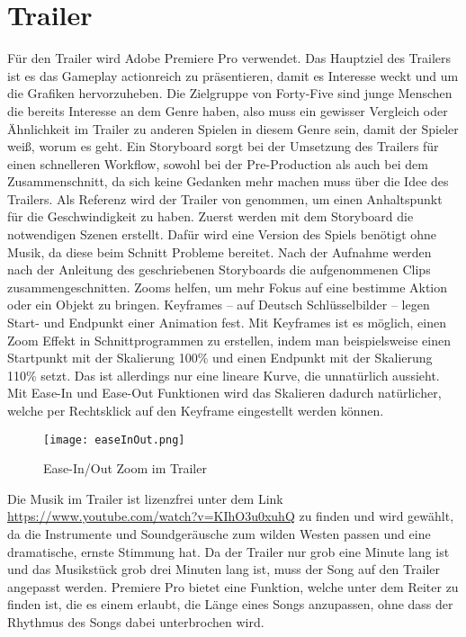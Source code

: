 \section{Trailer}\label{sec:trailer}

\renewcommand{\kapitelautor}{Autor: Markus Böheim}

Für den Trailer wird Adobe Premiere Pro verwendet.
Das Hauptziel des Trailers
ist es das Gameplay actionreich zu präsentieren, damit es Interesse weckt und um die Grafiken hervorzuheben.
Die Zielgruppe von Forty-Five sind junge Menschen die bereits Interesse an dem Genre haben, also muss ein gewisser
Vergleich oder Ähnlichkeit im Trailer zu anderen Spielen in diesem Genre sein, damit der Spieler weiß, worum es geht.
Ein Storyboard sorgt bei der Umsetzung des Trailers für einen
schnelleren Workflow, sowohl bei der Pre-Production als auch bei dem Zusammenschnitt, da sich keine Gedanken mehr machen muss über die Idee des Trailers.
Als Referenz wird der Trailer von  genommen, um einen Anhaltspunkt für die Geschwindigkeit zu haben.
Zuerst werden mit dem Storyboard die notwendigen Szenen erstellt.
Dafür wird eine Version des Spiels benötigt ohne Musik, da diese beim Schnitt Probleme bereitet.
Nach der Aufnahme werden nach der Anleitung des geschriebenen Storyboards die aufgenommenen Clips zusammengeschnitten.
Zooms helfen, um mehr Fokus auf eine bestimme Aktion oder ein Objekt zu bringen.
Keyframes – auf Deutsch Schlüsselbilder – legen Start- und Endpunkt einer Animation fest.
Mit Keyframes ist es möglich, einen Zoom Effekt in Schnittprogrammen zu erstellen, indem man beispielsweise einen Startpunkt mit der Skalierung 100\% und einen Endpunkt mit der Skalierung 110\% setzt.
Das ist allerdings nur eine lineare Kurve, die unnatürlich aussieht.
Mit Ease-In und Ease-Out Funktionen wird das Skalieren dadurch natürlicher, welche per Rechtsklick auf den Keyframe eingestellt werden können.

\begin{figure}[H]
\centering
\texttt{[image: easeInOut.png]}
\caption{Ease-In/Out Zoom im Trailer}
\end{figure}

Die Musik im Trailer ist lizenzfrei unter dem Link \url{https://www.youtube.com/watch?v=KIhO3u0xuhQ} zu finden und wird gewählt, da die Instrumente und Soundgeräusche zum wilden Westen passen und eine dramatische, ernste Stimmung hat. Da der Trailer nur grob eine Minute lang ist und das Musikstück grob drei Minuten lang ist, muss der Song auf den Trailer angepasst werden.
Premiere Pro bietet eine  Funktion, welche unter dem 
Reiter zu finden ist, die es einem erlaubt, die Länge eines Songs anzupassen, ohne dass der Rhythmus des Songs dabei unterbrochen wird.

